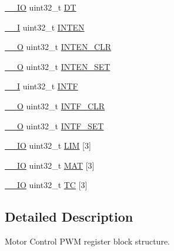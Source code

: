 \begin{DoxyCompactItemize}
\item 
\hyperlink{core__cm3_8h_aec43007d9998a0a0e01faede4133d6be}{\+\_\+\+\_\+\+IO} uint32\+\_\+t \hyperlink{structLPC__MCPWM__T_a15d8f4f81c3e82a335d4abb02863b850}{DT}
\item 
\hyperlink{core__cm3_8h_af63697ed9952cc71e1225efe205f6cd3}{\+\_\+\+\_\+I} uint32\+\_\+t \hyperlink{structLPC__MCPWM__T_a2f6d65b7d9772a735474d90311e738b6}{I\+N\+T\+EN}
\item 
\hyperlink{core__cm3_8h_a7e25d9380f9ef903923964322e71f2f6}{\+\_\+\+\_\+O} uint32\+\_\+t \hyperlink{structLPC__MCPWM__T_a5694122ceacd913b57424a90be8f7f63}{I\+N\+T\+E\+N\+\_\+\+C\+LR}
\item 
\hyperlink{core__cm3_8h_a7e25d9380f9ef903923964322e71f2f6}{\+\_\+\+\_\+O} uint32\+\_\+t \hyperlink{structLPC__MCPWM__T_ab678eeb9fa0e190473e58d179778a249}{I\+N\+T\+E\+N\+\_\+\+S\+ET}
\item 
\hyperlink{core__cm3_8h_af63697ed9952cc71e1225efe205f6cd3}{\+\_\+\+\_\+I} uint32\+\_\+t \hyperlink{structLPC__MCPWM__T_a0bfcbbed2fabcf16419d014ff01e8e37}{I\+N\+TF}
\item 
\hyperlink{core__cm3_8h_a7e25d9380f9ef903923964322e71f2f6}{\+\_\+\+\_\+O} uint32\+\_\+t \hyperlink{structLPC__MCPWM__T_acd49890931c9446a54e8070478cf7185}{I\+N\+T\+F\+\_\+\+C\+LR}
\item 
\hyperlink{core__cm3_8h_a7e25d9380f9ef903923964322e71f2f6}{\+\_\+\+\_\+O} uint32\+\_\+t \hyperlink{structLPC__MCPWM__T_a4c129a22156572b5671ff0e8b9f1977d}{I\+N\+T\+F\+\_\+\+S\+ET}
\item 
\hyperlink{core__cm3_8h_aec43007d9998a0a0e01faede4133d6be}{\+\_\+\+\_\+\+IO} uint32\+\_\+t \hyperlink{structLPC__MCPWM__T_a01c2889381949b5b1f8c2bf8edf9148c}{L\+IM} \mbox{[}3\mbox{]}
\item 
\hyperlink{core__cm3_8h_aec43007d9998a0a0e01faede4133d6be}{\+\_\+\+\_\+\+IO} uint32\+\_\+t \hyperlink{structLPC__MCPWM__T_ac3b16a52a48e436af60d17ce27c5c879}{M\+AT} \mbox{[}3\mbox{]}
\item 
\hyperlink{core__cm3_8h_aec43007d9998a0a0e01faede4133d6be}{\+\_\+\+\_\+\+IO} uint32\+\_\+t \hyperlink{structLPC__MCPWM__T_ae6960477ec37aa32fbb20956cf01edb7}{TC} \mbox{[}3\mbox{]}
\end{DoxyCompactItemize}


\subsection{Detailed Description}
Motor Control P\+WM register block structure. 


